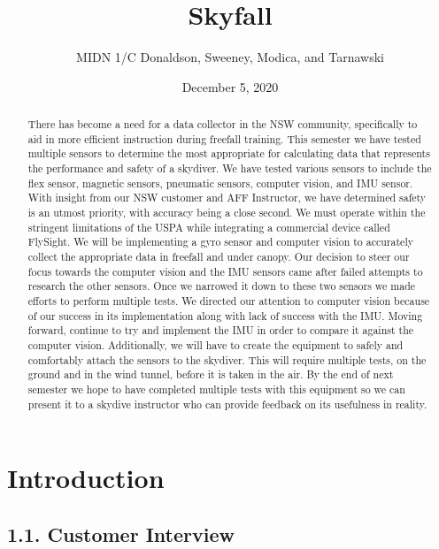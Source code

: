 \documentclass[10pt]{article}
\title{Skyfall}
\author{MIDN 1/C Donaldson, Sweeney, Modica, and Tarnawski}
\date{December 5, 2020}
\begin{document}
\maketitle



\begin{abstract}

There has become a need for a data collector in the NSW community, specifically to aid in more efficient instruction during freefall training. This semester we have tested multiple sensors to determine the most appropriate for calculating data that represents the performance and safety of a skydiver. We have tested various sensors to include the flex sensor, magnetic sensors, pneumatic sensors, computer vision, and IMU sensor. With insight from our NSW customer and AFF Instructor, we have determined safety is an utmost priority, with accuracy being a close second. We must operate within the stringent limitations of the USPA while integrating a commercial device called FlySight. We will be implementing a gyro sensor and computer vision to accurately collect the appropriate data in freefall and under canopy. Our decision to steer our focus towards the computer vision and the IMU sensors came after failed attempts to research the other sensors. Once we narrowed it down to these two sensors we made efforts to perform multiple tests. We directed our attention to computer vision because of our success in its implementation along with lack of success with the IMU. Moving forward, continue to try and implement the IMU in order to compare it against the computer vision. Additionally, we will have to create the equipment to safely and comfortably attach the sensors to the skydiver. This will require multiple tests, on the ground and in the wind tunnel, before it is taken in the air. By the end of next semester we hope to have completed multiple tests with this equipment so we can present it to a skydive instructor who can provide feedback on its usefulness in reality.
\end{abstract}








\section{Introduction}



\subsection{1.1. Customer Interview}
\end{document}

